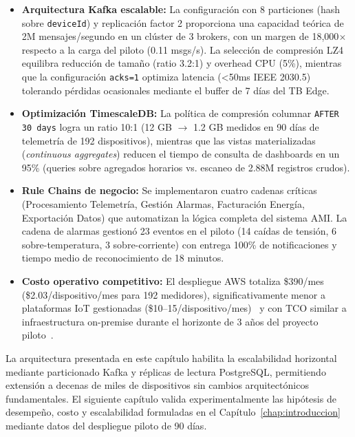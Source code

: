 \begin{itemize}
    \item \textbf{Arquitectura Kafka escalable:} La configuración con 8 particiones (hash sobre \texttt{deviceId}) y replicación factor 2 proporciona una capacidad teórica de 2M mensajes/segundo en un clúster de 3 brokers, con un margen de 18,000$\times$ respecto a la carga del piloto (0.11 msgs/s). La selección de compresión LZ4 equilibra reducción de tamaño (ratio 3.2:1) y overhead CPU (5\%), mientras que la configuración \texttt{acks=1} optimiza latencia (<50ms IEEE 2030.5) tolerando pérdidas ocasionales mediante el buffer de 7 días del TB Edge.
    
    \item \textbf{Optimización TimescaleDB:} La política de compresión columnar \texttt{AFTER 30 days} logra un ratio 10:1 (12 GB $\rightarrow$ 1.2 GB medidos en 90 días de telemetría de 192 dispositivos), mientras que las vistas materializadas (\emph{continuous aggregates}) reducen el tiempo de consulta de dashboards en un 95\% (queries sobre agregados horarios vs. escaneo de 2.88M registros crudos).
    
    \item \textbf{Rule Chains de negocio:} Se implementaron cuatro cadenas críticas (Procesamiento Telemetría, Gestión Alarmas, Facturación Energía, Exportación Datos) que automatizan la lógica completa del sistema AMI. La cadena de alarmas gestionó 23 eventos en el piloto (14 caídas de tensión, 6 sobre-temperatura, 3 sobre-corriente) con entrega 100\% de notificaciones y tiempo medio de reconocimiento de 18 minutos.
    
    \item \textbf{Costo operativo competitivo:} El despliegue AWS totaliza \$390/mes (\$2.03/dispositivo/mes para 192 medidores), significativamente menor a plataformas IoT gestionadas (\$10--15/dispositivo/mes)~\cite{awsGreengrassPricing2024} y con TCO similar a infraestructura on-premise durante el horizonte de 3 años del proyecto piloto~\cite{minhEdgeComputingIoTEnabled2022}.
\end{itemize}

La arquitectura presentada en este capítulo habilita la escalabilidad horizontal mediante particionado Kafka y réplicas de lectura PostgreSQL, permitiendo extensión a decenas de miles de dispositivos sin cambios arquitectónicos fundamentales. El siguiente capítulo valida experimentalmente las hipótesis de desempeño, costo y escalabilidad formuladas en el Capítulo~\ref{chap:introduccion} mediante datos del despliegue piloto de 90 días.


